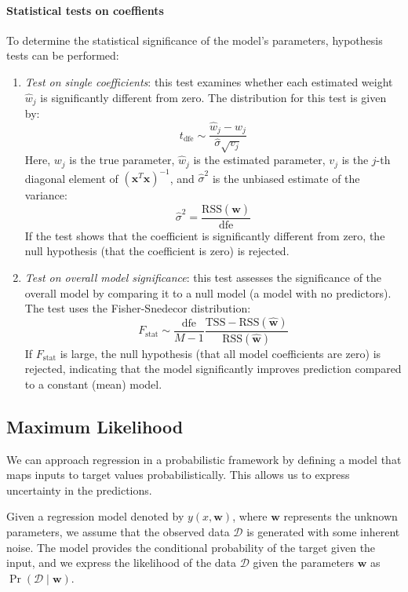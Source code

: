 \paragraph*{Statistical tests on coeffients}
To determine the statistical significance of the model's parameters, hypothesis tests can be performed:
\begin{enumerate}
    \item \textit{Test on single coefficients}: this test examines whether each estimated weight $\hat{w}_j$ is significantly different from zero.
        The distribution for this test is given by:
        \[t_{\text{dfe}}\sim\dfrac{\hat{w}_j-w_j}{\hat{\sigma}\sqrt{v_j}}\]
        Here, $w_j$ is the true parameter, $\hat{w}_j$ is the estimated parameter, $v_j$ is the $j$-th diagonal element of $(\mathbf{x}^T\mathbf{x})^{-1}$, and $\hat{\sigma}^2$ is the unbiased estimate of the variance:
        \[\hat{\sigma}^2=\dfrac{\text{RSS}(\hat{\mathbf{w}})}{\text{dfe}}\]
        If the test shows that the coefficient is significantly different from zero, the null hypothesis (that the coefficient is zero) is rejected.
    \item \textit{Test on overall model significance}: this test assesses the significance of the overall model by comparing it to a null model (a model with no predictors).
        The test uses the Fisher-Snedecor distribution:
        \[F_\text{stat}\sim\dfrac{\text{dfe}}{M-1}\dfrac{\text{TSS}-\text{RSS}(\hat{\mathbf{w}})}{\text{RSS}(\hat{\mathbf{w}})}\]  
        If $F_\text{stat}$ is large, the null hypothesis (that all model coefficients are zero) is rejected, indicating that the model significantly improves prediction compared to a constant (mean) model.
\end{enumerate}

\subsection{Maximum Likelihood}
We can approach regression in a probabilistic framework by defining a model that maps inputs to target values probabilistically. This allows us to express uncertainty in the predictions.

Given a regression model denoted by $y(x, \mathbf{w})$, where $\mathbf{w}$ represents the unknown parameters, we assume that the observed data $\mathcal{D}$ is generated with some inherent noise.
The model provides the conditional probability of the target given the input, and we express the likelihood of the data $\mathcal{D}$ given the parameters $\mathbf{w}$ as $\Pr(\mathcal{D}\mid\mathbf{w})$. 

